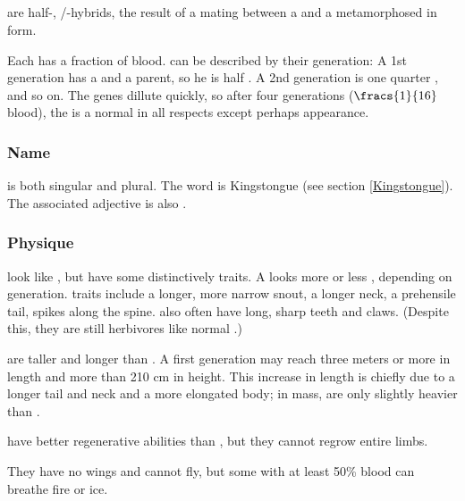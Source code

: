 \subsection{\Rachyth{}}
\label{\Rachyth}
\Rachyth{} are half-\dragons{}, \dragon{}/\scatha{}-hybrids, the result of a mating between a \scatha{} and a metamorphosed \dragon{} in \scatha{} form. 

Each \rachyth{} has a fraction of \dragon{} blood. \Rachyth{} can be described by their generation: A 1st generation \rachyth{} has a \dragon{} and a \scatha{} parent, so he is half \dragon{}. A 2nd generation \rachyth{} is one quarter \dragon{}, and so on. The \dragon{} genes dillute quickly, so after four generations ($\fracs{1}{16}$ \dragon{} blood), the \rachyth{} is a normal \scatha{} in all respects except perhaps appearance. 

\subsubsection{Name}
 is both singular and plural. The word is \Draconic{} Kingstongue (see section \ref{Kingstongue}). The associated adjective is also \emph{\rachyth{}}. 

\subsubsection{Physique}
\Rachyth{} look like \scathae{}, but have some distinctively \draconic{} traits. A \rachyth{} looks more or less \draconic{}, depending on generation. \Draconic{} traits include a longer, more narrow snout, a longer neck, a prehensile tail, spikes along the spine. \Rachyth{} also often have long, sharp teeth and claws. (Despite this, they are still herbivores like normal \scathae{}.) 

\Rachyth{} are taller and longer than \scathae{}. A first generation \rachyth{} may reach three meters or more in length and more than 210 cm in height. This increase in length is chiefly due to a longer tail and neck and a more elongated body; in mass, \rachyth{} are only slightly heavier than \scathae{}. 

\Rachyth{} have better regenerative abilities than \scathae{}, but they cannot regrow entire limbs. 

They have no wings and cannot fly, but some \rachyth{} with at least 50\% \dragon{} blood can breathe fire or ice. 

